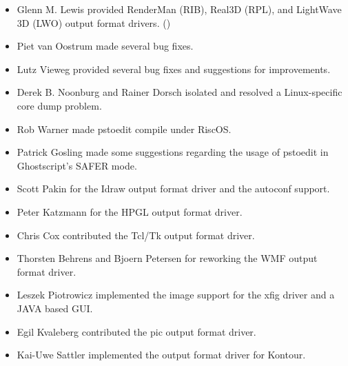 \documentclass[english,a4paper]{article}
\begin{document}
\begin{itemize}
  \item Glenn M. Lewis  provided RenderMan (RIB),
     Real3D (RPL), and LightWave 3D (LWO) output format drivers.
     ()

  \item Piet van Oostrum  made several bug fixes.

  \item Lutz Vieweg  provided several bug fixes and
     suggestions for improvements.

  \item Derek B. Noonburg  and Rainer Dorsch
      isolated and resolved a
     Linux-specific core dump problem.

  \item Rob Warner  made pstoedit compile under RiscOS.

  \item Patrick Gosling  made some suggestions
     regarding the usage of pstoedit in Ghostscript's SAFER mode.

  \item Scott Pakin  for the Idraw output format driver and the
	autoconf support.

  \item Peter Katzmann  for the HPGL output format driver.

  \item Chris Cox  contributed the Tcl/Tk output format driver.

  \item Thorsten Behrens  and
     Bjoern Petersen for reworking the WMF output format driver.

  \item Leszek Piotrowicz  implemented the image
     support for the xfig driver and a JAVA based GUI.

  \item Egil Kvaleberg  contributed the pic output format driver.

  \item Kai-Uwe Sattler  implemented the
     output format driver for Kontour.


\end{itemize}
\end{document}
